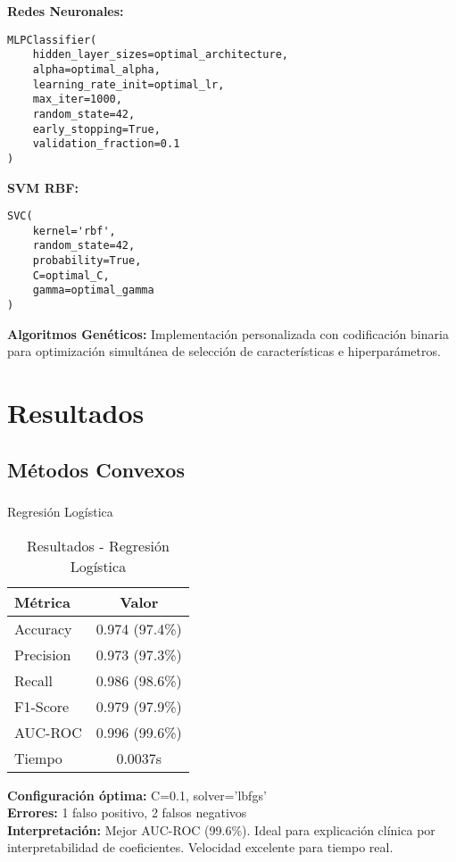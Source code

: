\documentclass[12pt,a4paper]{article}
\begin{document}
\textbf{Redes Neuronales:}
\begin{verbatim}
MLPClassifier(
    hidden_layer_sizes=optimal_architecture,
    alpha=optimal_alpha,
    learning_rate_init=optimal_lr,
    max_iter=1000,
    random_state=42,
    early_stopping=True,
    validation_fraction=0.1
)
\end{verbatim}

\textbf{SVM RBF:}
\begin{verbatim}
SVC(
    kernel='rbf',
    random_state=42,
    probability=True,
    C=optimal_C,
    gamma=optimal_gamma
)
\end{verbatim}

\textbf{Algoritmos Genéticos:}
Implementación personalizada con codificación binaria para optimización simultánea de selección de características e hiperparámetros.

\section{Resultados}

\subsection{Métodos Convexos}

\subsubsection{}{Regresión Logística}

\begin{table}[H]
\centering
\caption{Resultados - Regresión Logística}
\begin{tabular}{lc}
\toprule
\textbf{Métrica} & \textbf{Valor} \\
\midrule
Accuracy & 0.974 (97.4\%) \\
Precision & 0.973 (97.3\%) \\
Recall & 0.986 (98.6\%) \\
F1-Score & 0.979 (97.9\%) \\
AUC-ROC & 0.996 (99.6\%) \\
Tiempo & 0.0037s \\
\bottomrule
\end{tabular}
\end{table}

\textbf{Configuración óptima:} C=0.1, solver='lbfgs'\\
\textbf{Errores:} 1 falso positivo, 2 falsos negativos\\
\textbf{Interpretación:} Mejor AUC-ROC (99.6\%). Ideal para explicación clínica por interpretabilidad de coeficientes. Velocidad excelente para tiempo real.
\end{document}
